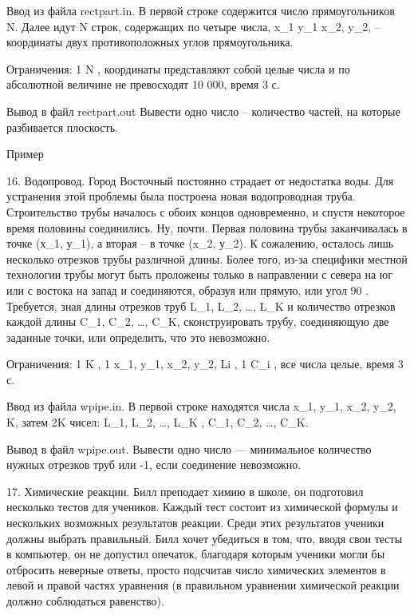 \documentclass[]{article}
\begin{document}
Ввод из файла rectpart.in. В первой строке содержится число прямоугольников N. Далее идут N строк, содержащих по четыре числа, x_1 y_1 x_2, y_2, – координаты двух противоположных углов прямоугольника.

Ограничения: 1 \leq N , координаты представляют собой целые числа и по абсолютной величине не превосходят 10 000, время 3 с.

Вывод в файл rectpart.out Вывести одно число – количество частей, на которые разбивается плоскость.

Пример



16. Водопровод. Город Восточный постоянно страдает от недостатка воды. Для устранения этой проблемы была построена новая водопроводная труба. Строительство трубы началось с обоих концов одновременно, и спустя некоторое время половины соединились. Ну, почти. Первая половина трубы заканчивалась в точке (х_1, у_1), а вторая – в точке (x_2, у_2). К сожалению, осталось лишь несколько отрезков трубы различной длины. Более того, из-за специфики местной технологии трубы могут быть проложены только в направлении с севера на юг или с востока на запад и соединяются, образуя или прямую, или угол 90 \deg. Требуется, зная длины отрезков труб L_1, L_2, \ldots, L_K и количество отрезков каждой длины C_1, C_2, \ldots, C_K, сконструировать трубу, соединяющую две заданные точки, или определить, что это невозможно.

Ограничения: 1 \leq K , 1 \leq x_1, y_1, x_2, y_2, Li , 1 \leq C_i , все числа целые, время 3 с.

Ввод из файла wpipe.in. В первой строке находятся числа x_1, y_1, x_2, y_2, K, затем 2K чисел: L_1, L_2, \ldots, L_K , C_1, C_2, \ldots, C_K.

Вывод в файл wpipe.out. Вывести одно число — минимальное количество нужных отрезков труб или -1, если соединение невозможно.



17. Химические реакции. Билл преподает химию в школе, он подготовил несколько тестов для учеников. Каждый тест состоит из химической формулы и нескольких возможных результатов реакции. Среди этих результатов ученики должны выбрать правильный. Билл хочет убедиться в том, что, вводя свои тесты в компьютер, он не допустил опечаток, благодаря которым ученики могли бы отбросить неверные ответы, просто подсчитав число химических элементов в левой и правой частях уравнения (в правильном уравнении химической реакции должно соблюдаться равенство).
\end{document}
